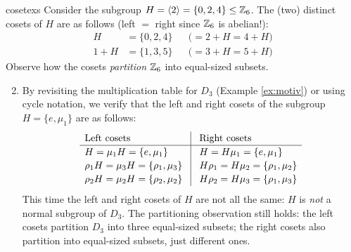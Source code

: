 \begin{examples}{}{cosetexs}
	\exstart\label{ex:cosets1} Consider the subgroup $H=\left\langle 2\right\rangle=\{0,2,4\}\le\mathbb{Z}_6$. The (two) distinct cosets of $H$ are as follows (left $=$ right since $\mathbb{Z}_6$ is abelian!):
	\begin{align*}
		H&=\{0,2,4\}&&\bigl(=2+H=4+H\bigr)\\
		1+H&=\{1,3,5\}&&\bigl(=3+H=5+H\bigr)
	\end{align*}
	Observe how the cosets \emph{partition} $\mathbb{Z}_6$ into equal-sized subsets.
	

	\begin{enumerate}\setcounter{enumi}{1}
		\item\label{ex:nonnormalcosets} By revisiting the multiplication table for $D_3$ (Example \ref{ex:motiv}) or using cycle notation, we verify that the left and right cosets of the subgroup $H=\{e,\mu_1\}$ are as follows:
		\[
			\renewcommand{\arraystretch}{1.15}
			\begin{array}{l@{\hspace*{.3cm}}|@{\hspace*{.3cm}}l}
		  	\text{Left cosets} & \text{Right cosets}\\\hline
				H=\mu_1H=\{e,\mu_1\}& H=H\mu_1=\{e,\mu_1\}\\
				\rho_1H=\mu_3H=\{\rho_1,\mu_3\} & H\rho_1=H\mu_2=\{\rho_1,\mu_2\}\\
				\rho_2H=\mu_2H=\{\rho_2,\mu_2\} & H\rho_2=H\mu_3=\{\rho_1,\mu_3\}
			\end{array}
		\]
		This time the left and right cosets of $H$ are not all the same: $H$ is \emph{not} a normal subgroup of $D_3$. The partitioning observation still holds: the left cosets partition $D_3$ into three equal-sized subsets; the right cosets also partition into equal-sized subsets, just different ones.
	

\end{enumerate}
\end{examples}
